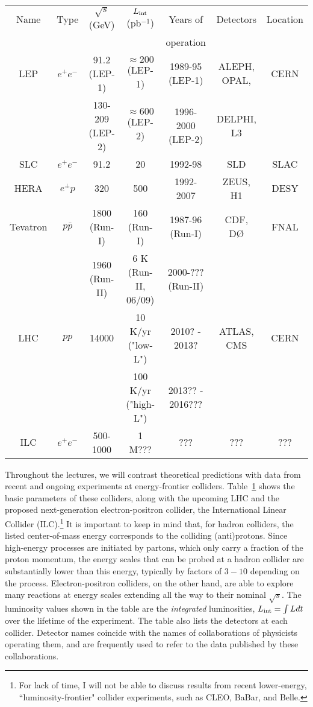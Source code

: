 \documentclass{ws-procs9x6}
\begin{document}
\renewcommand{\arraystretch}{1.4}
\begin{table}
\footnotesize
{}
{\begin{tabular}{|c|c|c|c|c|c|c|} \hline
  Name & Type & $\sqrt{s}$ (GeV) & $L_{\rm int}$ (pb$^{-1}$) & 
Years of & Detectors  & Location \\
 & & & & operation & & \\ \hline \hline
 LEP & $e^+e^-$ & 91.2 (LEP-1) & $\approx 200$ (LEP-1) & 1989-95 (LEP-1) & ALEPH, OPAL, & CERN \\
      &  & 130-209 (LEP-2) & $\approx 600$ (LEP-2) & 1996-2000 (LEP-2) & DELPHI, L3 & \\
 SLC & $e^+e^-$ & 91.2 & 20 & 1992-98 & SLD & SLAC \\
 HERA & $e^\pm p$ & 320 & 500 & 1992-2007 & ZEUS, H1 & DESY \\
Tevatron & $p\bar{p}$ & 1800 (Run-I) & 160 (Run-I) & 1987-96 (Run-I) & CDF, D{\O} & FNAL \\
& & 1960 (Run-II) & 6 K (Run-II, 06/09) & 2000-??? (Run-II) & & \\
LHC & $pp$ & 14000 & 10 K/yr ("low-L") & 2010? - 2013?&
ATLAS, CMS & CERN \\
& & & 100 K/yr ("high-L") &2013?? - 2016???& & \\ 
ILC & $e^+e^-$ & 500-1000 & 1 M??? & ??? & ??? & ??? \\
 \hline
\end{tabular} }
\label{tab:colliders}
\end{table}
\renewcommand{\arraystretch}{1.0}


Throughout the lectures, we will contrast theoretical predictions with data from recent and ongoing experiments at energy-frontier colliders. Table~\ref{tab:colliders} shows the basic parameters of these colliders, along with the upcoming LHC and the proposed next-generation electron-positron collider, the International Linear Collider (ILC).\footnote{For lack of time, I will not be able to discuss results from recent lower-energy, ``luminosity-frontier" collider experiments, such as CLEO, BaBar, and Belle.} It is important to keep in mind that, for hadron colliders, the listed center-of-mass energy corresponds to the colliding (anti)protons. Since high-energy processes are initiated by partons, which only carry a fraction of the proton momentum, the energy scales that can be probed at a hadron collider are substantially lower than this energy, typically by factors of $3-10$ depending on the process. Electron-positron colliders, on the other hand, are able to explore many reactions at energy scales extending all the way to their nominal $\sqrt{s}$. The luminosity values shown in the table are the {\it integrated} luminosities, $L_{\rm int}=\int L dt$ over the lifetime of the experiment. The table also lists the detectors at each collider. Detector names coincide with the names of collaborations of physicists operating them, and are frequently used to refer to the data published by these collaborations.    
\end{document}

